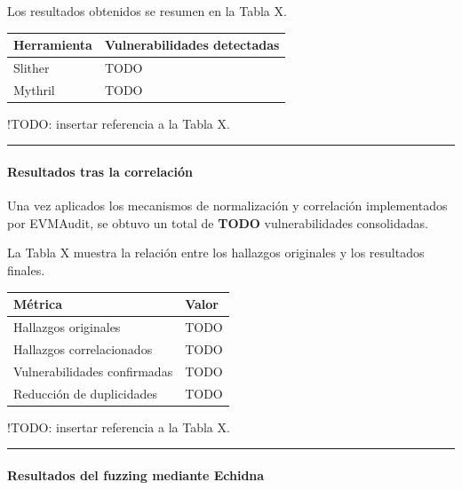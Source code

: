 Los resultados obtenidos se resumen en la Tabla X.

{\def\LTcaptype{none} %
\begin{longtable}[]{@{}ll@{}}
\toprule\noalign{}
Herramienta & Vulnerabilidades detectadas \\
\midrule\noalign{}
\endhead
\bottomrule\noalign{}
\endlastfoot
Slither & TODO \\
Mythril & TODO \\
\end{longtable}
}

!TODO: insertar referencia a la Tabla X.

\begin{center}\rule{0.5\linewidth}{0.5pt}\end{center}

\paragraph{Resultados tras la
correlación}\label{resultados-tras-la-correlaciuxf3n}

Una vez aplicados los mecanismos de normalización y correlación
implementados por EVMAudit, se obtuvo un total de \textbf{TODO}
vulnerabilidades consolidadas.

La Tabla X muestra la relación entre los hallazgos originales y los
resultados finales.

{\def\LTcaptype{none} %
\begin{longtable}[]{@{}ll@{}}
\toprule\noalign{}
Métrica & Valor \\
\midrule\noalign{}
\endhead
\bottomrule\noalign{}
\endlastfoot
Hallazgos originales & TODO \\
Hallazgos correlacionados & TODO \\
Vulnerabilidades confirmadas & TODO \\
Reducción de duplicidades & TODO \\
\end{longtable}
}

!TODO: insertar referencia a la Tabla X.

\begin{center}\rule{0.5\linewidth}{0.5pt}\end{center}

\paragraph{Resultados del fuzzing mediante
Echidna}\label{resultados-del-fuzzing-mediante-echidna}

